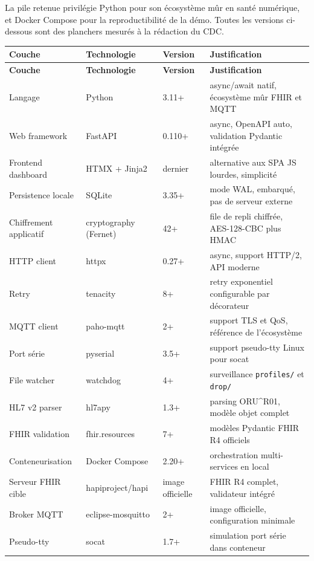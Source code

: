 La pile retenue privilégie Python pour son écosystème mûr en santé numérique, et Docker Compose pour la reproductibilité de la démo. Toutes les versions ci-dessous sont des planchers mesurés à la rédaction du CDC.

\bridgezebra
\begin{longtable}{p{3cm}p{4cm}p{2cm}p{6cm}}
  \toprule
  \rowcolor{bridgeblue!90}
  {\color{white}\bfseries Couche} & {\color{white}\bfseries Technologie} & {\color{white}\bfseries Version} & {\color{white}\bfseries Justification} \\
  \midrule
  \endfirsthead
  \toprule
  \rowcolor{bridgeblue!90}
  {\color{white}\bfseries Couche} & {\color{white}\bfseries Technologie} & {\color{white}\bfseries Version} & {\color{white}\bfseries Justification} \\
  \midrule
  \endhead
  \bottomrule
  \endfoot
  Langage & Python & 3.11+ & async/await natif, écosystème mûr FHIR et MQTT \\
  Web framework & FastAPI & 0.110+ & async, OpenAPI auto, validation Pydantic intégrée \\
  Frontend dashboard & HTMX + Jinja2 & dernier & alternative aux SPA JS lourdes, simplicité \\
  Persistence locale & SQLite & 3.35+ & mode WAL, embarqué, pas de serveur externe \\
  Chiffrement applicatif & cryptography (Fernet) & 42+ & file de repli chiffrée, AES-128-CBC plus HMAC \\
  HTTP client & httpx & 0.27+ & async, support HTTP/2, API moderne \\
  Retry & tenacity & 8+ & retry exponentiel configurable par décorateur \\
  MQTT client & paho-mqtt & 2+ & support TLS et QoS, référence de l'écosystème \\
  Port série & pyserial & 3.5+ & support pseudo-tty Linux pour socat \\
  File watcher & watchdog & 4+ & surveillance \texttt{profiles/} et \texttt{drop/} \\
  HL7 v2 parser & hl7apy & 1.3+ & parsing ORU\textasciicircum{}R01, modèle objet complet \\
  FHIR validation & fhir.resources & 7+ & modèles Pydantic FHIR R4 officiels \\
  Conteneurisation & Docker Compose & 2.20+ & orchestration multi-services en local \\
  Serveur FHIR cible & hapiproject/hapi & image officielle & FHIR R4 complet, validateur intégré \\
  Broker MQTT & eclipse-mosquitto & 2+ & image officielle, configuration minimale \\
  Pseudo-tty & socat & 1.7+ & simulation port série dans conteneur \\
\end{longtable}

